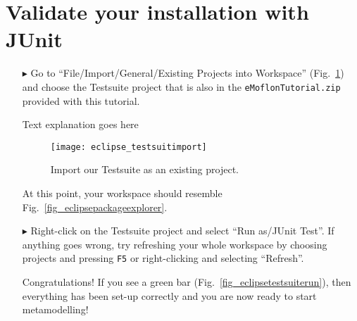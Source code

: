 \section{Validate your installation with JUnit}
\label{sec:junit}

\begin{enumerate}
\item[$\blacktriangleright$] Go to ``File/Import/General/Existing Projects into Workspace'' (Fig.~\ref{fig_eclipseTestsuiteImport}) and choose the Testsuite project that is also in the \texttt{eMoflonTutorial.zip} provided with this tutorial. 

\newpage
\texHeader
Text explanation goes here
\pagebreak

\visHeader

\begin{figure}[htbp]
	\centering
  \texttt{[image: eclipse\_testsuitimport]}
	\caption{Import our Testsuite as an existing project.}
	\label{fig_eclipseTestsuiteImport}
\end{figure} 


\item[] At this point, your workspace should resemble Fig.~\ref{fig_eclipsepackageexplorer}.


\item[$\blacktriangleright$] Right-click on the Testsuite project and select ``Run as/JUnit Test''.
If anything goes wrong, try refreshing your whole workspace by choosing projects and pressing \texttt{F5} or right-clicking and selecting ``Refresh''.


Congratulations!  If you see a green bar  (Fig.~\ref{fig_eclipsetestsuiterun}), then everything has been set-up correctly and you are now ready to start metamodelling!

\end{enumerate}

